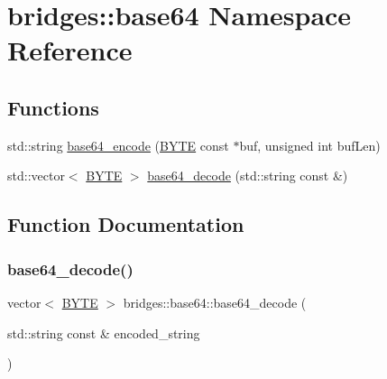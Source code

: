\hypertarget{namespacebridges_1_1base64}{}\section{bridges\+:\+:base64 Namespace Reference}
\label{namespacebridges_1_1base64}
\subsection*{Functions}
\begin{DoxyCompactItemize}
\item 
std\+::string \mbox{\hyperlink{namespacebridges_1_1base64_a8f31c0ba095bbe2f9c1bdd82e369c730}{base64\+\_\+encode}} (\mbox{\hyperlink{namespacebridges_a59b77ee45243ba85c701fb8ab298ef00}{B\+Y\+TE}} const $\ast$buf, unsigned int buf\+Len)
\item 
std\+::vector$<$ \mbox{\hyperlink{namespacebridges_a59b77ee45243ba85c701fb8ab298ef00}{B\+Y\+TE}} $>$ \mbox{\hyperlink{namespacebridges_1_1base64_acc28338bcb3f1c6d50ccc439a927b207}{base64\+\_\+decode}} (std\+::string const \&)
\end{DoxyCompactItemize}


\subsection{Function Documentation}
\mbox{\label{namespacebridges_1_1base64_acc28338bcb3f1c6d50ccc439a927b207}} 
\subsubsection{\texorpdfstring{base64\+\_\+decode()}{base64\_decode()}}
{\footnotesize\ttfamily vector$<$ \mbox{\hyperlink{namespacebridges_a59b77ee45243ba85c701fb8ab298ef00}{B\+Y\+TE}} $>$ bridges\+::base64\+::base64\+\_\+decode (\begin{DoxyParamCaption}\item[{std\+::string const \&}]{encoded\+\_\+string }\end{DoxyParamCaption})}

\mbox{\label{namespacebridges_1_1base64_a8f31c0ba095bbe2f9c1bdd82e369c730}} 
